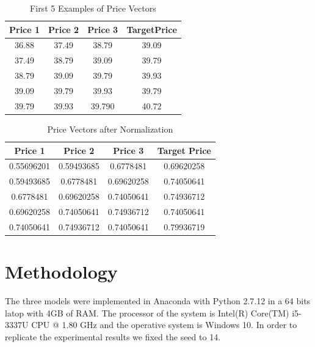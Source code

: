 \begin{table}{}
\begin{center}
\begin{tabular}{ c | c | c | c }
    \hline
     \textbf{Price 1} &  \textbf{Price 2} &    \textbf{Price 3} &   \textbf{TargetPrice}\\ \hline
    36.88&  37.49&  38.79 &39.09\\ \hline
    37.49&  38.79&  39.09&39.79\\ \hline
    38.79&  39.09&  39.79&39.93\\ \hline
   39.09&  39.79&  39.93&39.79\\ \hline
    39.79&  39.93&  39.790&40.72\\ \hline
    \hline
  \end{tabular}
\caption{First 5 Examples of Price Vectors}
 \label{table:trainPrices}
\end{center}

 \end{table}


\begin{table}{}
\begin{center}
\begin{tabular}{ c | c | c | c }
    \hline
    \textbf{Price 1} &  \textbf{Price 2} &    \textbf{Price 3} &   \textbf{Target Price} \\ \hline
    0.55696201 &  0.59493685&  0.6778481 &0.69620258\\ \hline
    0.59493685 &  0.6778481 &  0.69620258 &0.74050641\\ \hline
     0.6778481 &  0.69620258 &  0.74050641&0.74936712\\ \hline
     0.69620258 & 0.74050641 &  0.74936712 &0.74050641\\ \hline
     0.74050641 &  0.74936712 &  0.74050641 &0.79936719\\ \hline
    \hline
  \end{tabular}
\caption{Price Vectors after Normalization}
\end{center}
\label{table:train}
 \end{table}
 
 \section{Methodology}

The three models were implemented in Anaconda with Python 2.7.12 in a 64 bits latop with 4GB of RAM. The processor of the system is Intel(R) Core(TM) i5-3337U CPU @ 1.80 GHz and the operative system is Windows 10. In order to replicate the experimental results we fixed the seed to 14. 
